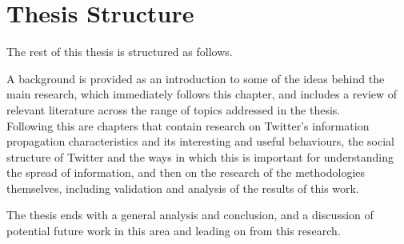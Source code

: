 \section{Thesis Structure}
The rest of this thesis is structured as follows.

A background is provided as an introduction to some of the ideas behind the main research, which immediately follows this chapter, and includes a review of relevant literature across the range of topics addressed in the thesis.\\
Following this are chapters that contain research on Twitter's information propagation characteristics and its interesting and useful behaviours, the social structure of Twitter and the ways in which this is important for understanding the spread of information, and then on the research of the methodologies themselves, including validation and analysis of the results of this work.

The thesis ends with a general analysis and conclusion, and a discussion of potential future work in this area and leading on from this research.